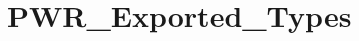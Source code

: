 \hypertarget{group__PWR__Exported__Types}{
\section{PWR\_\-Exported\_\-Types}
\label{group__PWR__Exported__Types}
}
